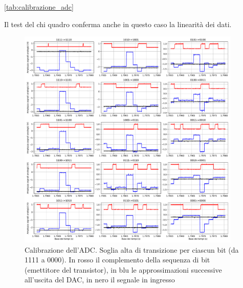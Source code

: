 \documentclass[journal]{IEEEtran}
\begin{document}
\ref{tab:calibrazione_adc}

Il test del chi quadro conferma anche in questo caso la linearità dei dati.

\begin{figure}[t]%
\centering
\includegraphics[trim = {30 0 50 0}, width=0.95\textwidth]{analysis/output/calibration.pdf}
\caption{Calibrazione dell'ADC. Soglia alta di transizione per ciascun bit (da 1111 a 0000). In rosso il complemento della sequenza di bit (emettitore del transistor), in blu le approssimazioni successive all'uscita del DAC, in nero il segnale in ingresso}
\label{fig:BIT_high_transition_threshold}
\end{figure}

\end{document}
